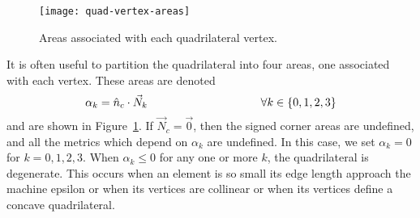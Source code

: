 \begin{figure}[htb]
  \centering
  \texttt{[image: quad-vertex-areas]}
  \caption{Areas associated with each quadrilateral vertex.%
                                                    \label{f:quad-vertex-areas}}
\end{figure}

It is often useful to partition the quadrilateral into four areas, one
associated with each vertex. These areas are denoted
\begin{equation*}
\alpha_k = \hat n_c \cdot \vec N_k\rule{10em}{0pt}\forall k\in\{0,1,2,3\}
\end{equation*}
and are shown in Figure~\ref{f:quad-vertex-areas}.
If $\vec N_c = \vec 0$, then the signed corner areas are undefined,
and all the metrics which depend on $\alpha_k$ are undefined.
In this case, we set $\alpha_k = 0$ for $k=0,1,2,3$.
When $\alpha_k \leq 0$ for any one or more $k$, the quadrilateral
is degenerate.
This occurs when
an element is so small its edge length approach the machine epsilon or
when its vertices are collinear or
when its vertices define a concave quadrilateral.

\newcommand{\quadmetrictable}[8]{%
  \begin{center}
  \begin{tabular}{ll}
    \multicolumn{2}{r}{\textbf{\sffamily\Large quadrilateral #1}}\\\hline
    Dimension:             & #2\\ 
    Acceptable Range:      & #3\\ 
    Normal Range:          & #4\\ 
    Full Range:            & #5\\ 
    $q$ for unit square:   & #6\\
    Reference:             & #7\\
    \verd\ function:       & \texttt{#8}\\ \hline
  \end{tabular} 
  \end{center}
}

\newpage 
\newpage 
\newpage 
\newpage 
\newpage 
\newpage 
\newpage 
\newpage 
\newpage 
\newpage 
\newpage 
\newpage 
\newpage 
\newpage 
\newpage 
\newpage 
\newpage 
\newpage 
\newpage 
\newpage 
\newpage 
\newpage 
\newpage 

